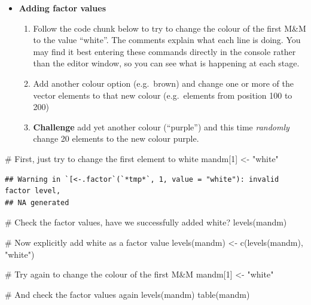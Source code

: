 \documentclass[a4paper]{book}
\newenvironment{Shaded}{}{}
\newcommand{\KeywordTok}[1]{\textcolor[rgb]{0.00,0.00,1.00}{{#1}}}
\newcommand{\DecValTok}[1]{{#1}}
\newcommand{\StringTok}[1]{\textcolor[rgb]{0.00,0.50,0.50}{{#1}}}
\newcommand{\CommentTok}[1]{\textcolor[rgb]{0.00,0.50,0.00}{{#1}}}
\newcommand{\NormalTok}[1]{{#1}}
\newlength{\leftbarwidth}
\newlength{\leftbarsep}
\newcommand*{\leftbarcolorcmd}{\color{darkgray}}%
\renewenvironment{leftbar}{%
    \def\FrameCommand{{\leftbarcolorcmd{\vrule width \leftbarwidth\relax\hspace {\leftbarsep}}}}%
    \MakeFramed {\advance \hsize -\width \FrameRestore }%
}{%
    \endMakeFramed
}
\renewenvironment{Shaded}
{\vspace{0em}\begin{leftbar}\begin{snugshade}}
{\end{snugshade}\end{leftbar}\vspace{0pt}}
\newenvironment{rmdblock}[1]
  {\vspace{1.5em}\begin{shaded*}
  \begin{itemize}
  \renewcommand{\labelitemi}{
    \raisebox{-.7\height}[0pt][0pt]{
      {\setkeys{Gin}{width=3em,keepaspectratio}\texttt{[image: images/\#1]}}
    }
  }
  \item
  }
  {
  \end{itemize}
  \end{shaded*}
  }
\newenvironment{rmdexercise}
  {\begin{rmdblock}{exercise}}
  {\end{rmdblock}}
\begin{document}
\begin{rmdexercise}
\textbf{Adding factor values}

\begin{enumerate}
\def\labelenumi{\arabic{enumi}.}
\item
  Follow the code chunk below to try to change the colour of the first
  M\&M to the value ``white''. The comments explain what each line is
  doing. You may find it best entering these commands directly in the
  console rather than the editor window, so you can see what is
  happening at each stage.
\item
  Add another colour option (e.g.~brown) and change one or more of the
  vector elements to that new colour (e.g.~elements from position 100 to
  200)
\item
  \textbf{Challenge} add yet another colour (``purple'') and this time
  \emph{randomly} change 20 elements to the new colour purple.
\end{enumerate}
\end{rmdexercise}

\begin{Shaded}
\begin{Highlighting}[]
\CommentTok{# First, just try to change the first element to white}
\NormalTok{mandm[}\DecValTok{1}\NormalTok{] <-}\StringTok{ "white"}
\end{Highlighting}
\end{Shaded}

\begin{verbatim}
## Warning in `[<-.factor`(`*tmp*`, 1, value = "white"): invalid factor level,
## NA generated
\end{verbatim}

\begin{Shaded}
\begin{Highlighting}[]
\CommentTok{# Check the factor values, have we successfully added white?}
\KeywordTok{levels}\NormalTok{(mandm)}

\CommentTok{# Now explicitly add white as a factor value}
\KeywordTok{levels}\NormalTok{(mandm) <-}\StringTok{ }\KeywordTok{c}\NormalTok{(}\KeywordTok{levels}\NormalTok{(mandm), }\StringTok{"white"}\NormalTok{)}

\CommentTok{# Try again to change the colour of the first M&M}
\NormalTok{mandm[}\DecValTok{1}\NormalTok{] <-}\StringTok{ "white"}

\CommentTok{# And check the factor values again}
\KeywordTok{levels}\NormalTok{(mandm)}
\KeywordTok{table}\NormalTok{(mandm)}
\end{Highlighting}
\end{Shaded}
\end{document}

